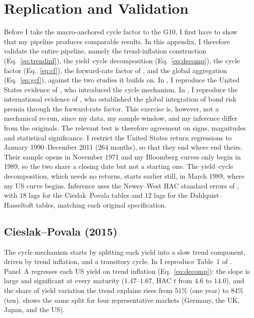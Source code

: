 \chapter{Replication and Validation}
\label{ch:replication}

Before I take the macro-anchored cycle factor to the G10, I first have to show
that my pipeline produces comparable results. In this appendix, I therefore validate the
entire pipeline, namely the trend-inflation construction (Eq.~\ref{eq:trendinf}), the
yield--cycle decomposition (Eq.~\ref{eq:decomp}), the cycle factor (Eq.~\ref{eq:cf}), the
forward-rate factor of \citet{cochrane2005}, and the global aggregation
(Eq.~\ref{eq:gcf}), against the two studies it builds on. In , I
reproduce the United States evidence of \citet{cieslak2015}, who introduced the
cycle mechanism. In , I reproduce the international evidence of
\citet{dahlquist2013}, who established the global integration of bond risk premia
through the forward-rate factor. This exercise is, however, not a mechanical
re-run, since my data, my sample window, and my inference differ from the
originals. The relevant test is therefore agreement on signs, magnitudes and statistical
significance. I restrict the United States return regressions to January
1990--December 2011 ($264$ months), so that they end where
\citet{cieslak2015} end theirs. Their sample opens in November 1971 and my
Bloomberg curves only begin in 1989, so the two share a closing date but not a
starting one. The yield--cycle decomposition, which
needs no returns, starts earlier still, in March 1989, where my US curve begins. Inference uses the Newey--West HAC standard errors of
, with $18$ lags
for the Cieslak--Povala tables and $12$ lags for the Dahlquist--Hasseltoft
tables, matching each original specification.

\section{Cieslak--Povala (2015)}
\label{sec:rep-cp}

The cycle mechanism starts by splitting each yield into a slow trend component,
driven by trend inflation, and a transitory cycle. In  I
reproduce Table~1 of \citet{cieslak2015}. Panel~A regresses each US yield on
trend inflation (Eq.~\ref{eq:decomp}): the slope is large and significant at every
maturity ($1.47$--$1.67$, HAC $t$ from $4.6$ to $14.0$), and the share of yield
variation the trend explains rises from $51\%$ (one year) to $84\%$ (ten).
 shows the same split for four representative markets
(Germany, the UK, Japan, and the US).

